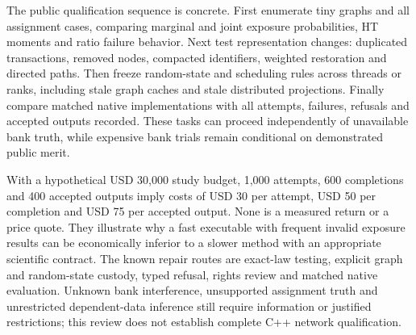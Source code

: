 The public qualification sequence is concrete. First enumerate tiny graphs and all assignment cases, comparing marginal and joint exposure probabilities, HT moments and ratio failure behavior. Next test representation changes: duplicated transactions, removed nodes, compacted identifiers, weighted restoration and directed paths. Then freeze random-state and scheduling rules across threads or ranks, including stale graph caches and stale distributed projections. Finally compare matched native implementations with all attempts, failures, refusals and accepted outputs recorded. These tasks can proceed independently of unavailable bank truth, while expensive bank trials remain conditional on demonstrated public merit.~\citep{exec25_cnet_choice}

With a hypothetical USD 30,000 study budget, 1,000 attempts, 600 completions and 400 accepted outputs imply costs of USD 30 per attempt, USD 50 per completion and USD 75 per accepted output. None is a measured return or a price quote. They illustrate why a fast executable with frequent invalid exposure results can be economically inferior to a slower method with an appropriate scientific contract. The known repair routes are exact-law testing, explicit graph and random-state custody, typed refusal, rights review and matched native evaluation. Unknown bank interference, unsupported assignment truth and unrestricted dependent-data inference still require information or justified restrictions; this review does not establish complete C++ network qualification.~\citep{exec25_cnet_choice}
